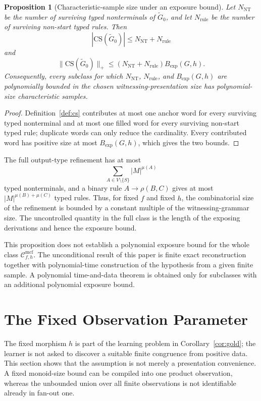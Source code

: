 \documentclass[11pt,a4paper]{article}
\newtheorem{proposition}[theorem]{Proposition}
\theoremstyle{remark}
\newcommand{\CS}{\mathrm{CS}}
\newcommand{\Cmcf}[2]{\mathcal{C}^{\mathrm{mcf}}_{#1,#2}}
\begin{document}
\begin{proposition}[Characteristic-sample size under an exposure bound]
\label{prop:cs-exposure-bound}
Let \(N_{\mathrm{NT}}\) be the number of surviving typed nonterminals of
\(\widetilde G_0\), and let \(N_{\mathrm{rule}}\) be the number of surviving
non-start typed rules.  Then
\[
  |\CS(\widetilde G_0)|
  \le N_{\mathrm{NT}}+N_{\mathrm{rule}}
\]
and
\[
  \|\CS(\widetilde G_0)\|_+
  \le
  (N_{\mathrm{NT}}+N_{\mathrm{rule}})
  B_{\mathrm{exp}}(G,h).
\]
Consequently, every subclass for which \(N_{\mathrm{NT}}\),
\(N_{\mathrm{rule}}\), and \(B_{\mathrm{exp}}(G,h)\) are polynomially bounded
in the chosen witnessing-presentation size has polynomial-size characteristic
samples.
\end{proposition}

\begin{proof}
Definition~\ref{def:cs} contributes at most one anchor word for every surviving
typed nonterminal and at most one filled word for every surviving non-start
typed rule; duplicate words can only reduce the cardinality.  Every contributed
word has positive size at most \(B_{\mathrm{exp}}(G,h)\), which gives the two
bounds.
\end{proof}

The full output-type refinement has at most
\[
  \sum_{A\in V\setminus\{S\}} |M|^{\mu(A)}
\]
typed nonterminals, and a binary rule \(A\to\rho(B,C)\) gives at most
\(|M|^{\mu(B)+\mu(C)}\) typed rules.  Thus, for fixed \(f\) and fixed \(h\),
the combinatorial size of the refinement is bounded by a constant multiple of
the witnessing-grammar size.  The uncontrolled quantity in the full class is
the length of the exposing derivations and hence the exposure bound.

This proposition does not establish a polynomial exposure bound for the whole
class \(\Cmcf{f}{h}\).  The unconditional result of this paper is finite exact
reconstruction together with polynomial-time construction of the hypothesis
from a given finite sample.  A polynomial time-and-data theorem is obtained
only for subclasses with an additional polynomial exposure bound.


\section{The Fixed Observation Parameter}
\label{sec:fixed-observation}

The fixed morphism \(h\) is part of the learning problem in
Corollary~\ref{cor:gold}; the learner is not asked to discover a suitable
finite congruence from positive data.  This section shows that the assumption is
not merely a presentation convenience.  A fixed monoid-size bound can be
compiled into one product observation, whereas the unbounded union over all
finite observations is not identifiable already in fan-out one.
\end{document}
